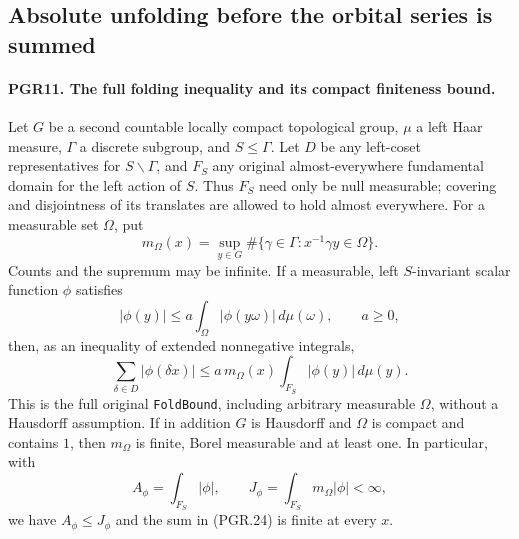 \subsection{Absolute unfolding before the orbital series is summed}

\paragraph{PGR11. The full folding inequality and its compact finiteness bound.}
\label{claim:PGR11}
Let \(G\) be a second countable locally compact topological group,
\(\mu\) a left Haar measure, \(\Gamma\) a discrete subgroup,
and \(S\leq\Gamma\).  Let \(D\) be any left-coset
representatives for \(S\backslash\Gamma\), and \(F_S\) any
original almost-everywhere fundamental domain for the left action
of \(S\).  Thus \(F_S\) need only be null measurable; covering
and disjointness of its translates are allowed to hold almost everywhere.
For a measurable set \(\Omega\), put
\[
 m_\Omega(x)=\sup_{y\in G}
       \#\{\gamma\in\Gamma:x^{-1}\gamma y\in\Omega\}.
\tag{PGR.22}
\]
Counts and the supremum may be infinite.  If a measurable,
left \(S\)-invariant scalar function \(\phi\) satisfies
\[
 |\phi(y)|\leq a\int_\Omega|\phi(y\omega)|\,d\mu(\omega),
 \qquad a\geq0,
\tag{PGR.23}
\]
then, as an inequality of extended nonnegative integrals,
\[
 \sum_{\delta\in D}|\phi(\delta x)|
       \leq a\,m_\Omega(x)\int_{F_S}|\phi(y)|\,d\mu(y).
\tag{PGR.24}
\]
This is the full original \texttt{FoldBound}, including arbitrary
measurable \(\Omega\), without a Hausdorff assumption.
If in addition \(G\) is Hausdorff and \(\Omega\) is compact
and contains \(1\), then \(m_\Omega\) is finite, Borel measurable and at
least one.  In particular, with
\[
 A_\phi=\int_{F_S}|\phi|,\qquad
 J_\phi=\int_{F_S}m_\Omega|\phi|<\infty,
\tag{PGR.25}
\]
we have \(A_\phi\leq J_\phi\) and the sum in (PGR.24)
is finite at every \(x\).

